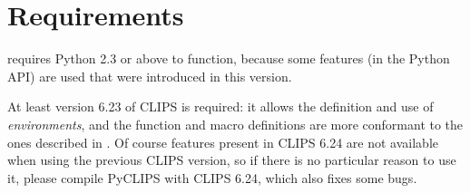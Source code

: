 \section{Requirements\label{pyclips-setup-requirements}}

\pyclips{} requires Python 2.3 or above to function, because some
features (in the Python API) are used that were introduced in this
version.

At least version 6.23 of CLIPS is required: it allows the definition and
use of \emph{environments}, and the function and macro definitions are
more conformant to the ones described in \clipsapg{}. Of course features
present in CLIPS 6.24 are not available when using the previous CLIPS
version, so if there is no particular reason to use it, please compile
PyCLIPS with CLIPS 6.24, which also fixes some bugs.

